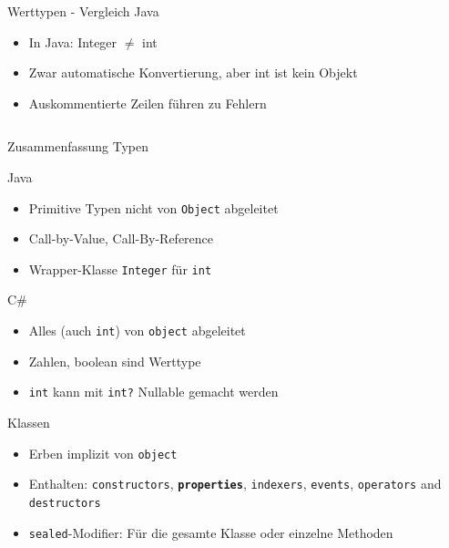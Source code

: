 \documentclass[11pt]{beamer}
\begin{document}
\begin{frame}{Werttypen - Vergleich Java}
	\begin{itemize}
		\item In Java: Integer $\neq$ int
		\item Zwar automatische Konvertierung, aber int ist kein Objekt
		\item Auskommentierte Zeilen führen zu Fehlern
	\end{itemize}
	\inputminted[firstline=9, lastline=15, linenos=true]{java}{Beispielcode/test/test.java}
	
\end{frame}


\begin{frame}{Zusammenfassung Typen}
\setlength{\columnseprule}{0.4pt}
\begin{multicols}{2}
	Java \\
	\begin{itemize}
		\item Primitive Typen nicht von \texttt{Object} abgeleitet
		\item Call-by-Value, Call-By-Reference
		\item Wrapper-Klasse \texttt{Integer} für \texttt{int}
	\end{itemize}

\columnbreak

	C\#\\
	\begin{itemize}
		\item Alles (auch \texttt{int}) von \texttt{object} abgeleitet
		\item Zahlen, boolean sind \glqq{}Werttype\grqq{}
		\item \texttt{int} kann mit \texttt{int?} Nullable gemacht werden
	\end{itemize}
\end{multicols}
\end{frame}


\begin{frame}{Klassen}

	\begin{itemize}
		\item Erben implizit von \texttt{object}
		\item  Enthalten: \texttt{constructors}, \textbf{\texttt{properties}}, \texttt{indexers}, \texttt{events}, \texttt{operators} and \texttt{destructors}
		 \item \texttt{sealed}-Modifier: Für die gesamte Klasse oder einzelne Methoden
	\end{itemize}

\end{frame}
\end{document}
